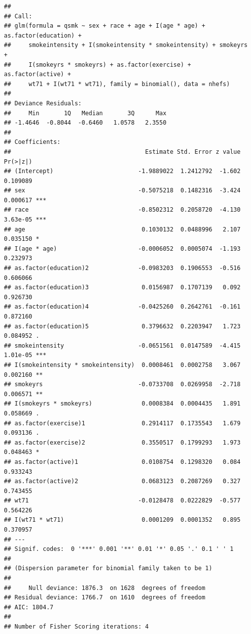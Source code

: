 \documentclass[
  10pt,
]{book}
\newenvironment{Shaded}{\begin{snugshade}}{\end{snugshade}}
\newcommand{\DataTypeTok}[1]{\textcolor[rgb]{0.13,0.29,0.53}{#1}}
\newcommand{\DecValTok}[1]{\textcolor[rgb]{0.00,0.00,0.81}{#1}}
\newcommand{\KeywordTok}[1]{\textcolor[rgb]{0.13,0.29,0.53}{\textbf{#1}}}
\newcommand{\NormalTok}[1]{#1}
\newcommand{\OperatorTok}[1]{\textcolor[rgb]{0.81,0.36,0.00}{\textbf{#1}}}
\newcommand{\StringTok}[1]{\textcolor[rgb]{0.31,0.60,0.02}{#1}}
\begin{document}
\begin{verbatim}
## 
## Call:
## glm(formula = qsmk ~ sex + race + age + I(age * age) + as.factor(education) + 
##     smokeintensity + I(smokeintensity * smokeintensity) + smokeyrs + 
##     I(smokeyrs * smokeyrs) + as.factor(exercise) + as.factor(active) + 
##     wt71 + I(wt71 * wt71), family = binomial(), data = nhefs)
## 
## Deviance Residuals: 
##     Min       1Q   Median       3Q      Max  
## -1.4646  -0.8044  -0.6460   1.0578   2.3550  
## 
## Coefficients:
##                                      Estimate Std. Error z value Pr(>|z|)    
## (Intercept)                        -1.9889022  1.2412792  -1.602 0.109089    
## sex                                -0.5075218  0.1482316  -3.424 0.000617 ***
## race                               -0.8502312  0.2058720  -4.130 3.63e-05 ***
## age                                 0.1030132  0.0488996   2.107 0.035150 *  
## I(age * age)                       -0.0006052  0.0005074  -1.193 0.232973    
## as.factor(education)2              -0.0983203  0.1906553  -0.516 0.606066    
## as.factor(education)3               0.0156987  0.1707139   0.092 0.926730    
## as.factor(education)4              -0.0425260  0.2642761  -0.161 0.872160    
## as.factor(education)5               0.3796632  0.2203947   1.723 0.084952 .  
## smokeintensity                     -0.0651561  0.0147589  -4.415 1.01e-05 ***
## I(smokeintensity * smokeintensity)  0.0008461  0.0002758   3.067 0.002160 ** 
## smokeyrs                           -0.0733708  0.0269958  -2.718 0.006571 ** 
## I(smokeyrs * smokeyrs)              0.0008384  0.0004435   1.891 0.058669 .  
## as.factor(exercise)1                0.2914117  0.1735543   1.679 0.093136 .  
## as.factor(exercise)2                0.3550517  0.1799293   1.973 0.048463 *  
## as.factor(active)1                  0.0108754  0.1298320   0.084 0.933243    
## as.factor(active)2                  0.0683123  0.2087269   0.327 0.743455    
## wt71                               -0.0128478  0.0222829  -0.577 0.564226    
## I(wt71 * wt71)                      0.0001209  0.0001352   0.895 0.370957    
## ---
## Signif. codes:  0 '***' 0.001 '**' 0.01 '*' 0.05 '.' 0.1 ' ' 1
## 
## (Dispersion parameter for binomial family taken to be 1)
## 
##     Null deviance: 1876.3  on 1628  degrees of freedom
## Residual deviance: 1766.7  on 1610  degrees of freedom
## AIC: 1804.7
## 
## Number of Fisher Scoring iterations: 4
\end{verbatim}

\begin{Shaded}
\end{Shaded}
\end{document}
